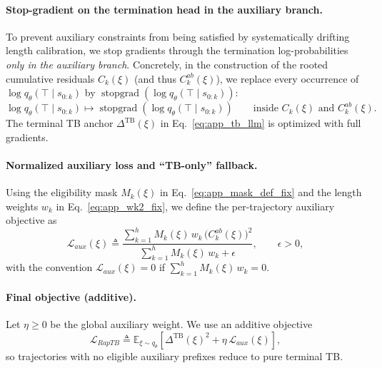 \documentclass{article}
\newcommand{\sg}[1]{\operatorname{stopgrad}\!\left(#1\right)}
\theoremstyle{plain}
\theoremstyle{definition}
\theoremstyle{remark}
\begin{document}
\paragraph{Stop-gradient on the termination head in the auxiliary branch.}
To prevent auxiliary constraints from being satisfied by systematically drifting length calibration,
we stop gradients through the termination log-probabilities \emph{only in the auxiliary branch}.
Concretely, in the construction of the rooted cumulative residuals $C_k(\xi)$ (and thus $C_k^{ab}(\xi)$),
we replace every occurrence of $\log q_\theta(\top\mid s_{0:k})$ by $\sg{\log q_\theta(\top\mid s_{0:k})}$:
\begin{equation}
\label{eq:app_detach_pterm}
\log q_\theta(\top\mid s_{0:k}) \mapsto \sg{\log q_\theta(\top\mid s_{0:k})}
\qquad\text{inside } C_k(\xi)\text{ and }C_k^{ab}(\xi).
\end{equation}
The terminal TB anchor $\Delta^{\mathrm{TB}}(\xi)$ in Eq.~\eqref{eq:app_tb_llm} is optimized with full gradients.

\paragraph{Normalized auxiliary loss and ``TB-only'' fallback.}
Using the eligibility mask $M_k(\xi)$ in Eq.~\eqref{eq:app_mask_def_fix} and the length weights $w_k$ in
Eq.~\eqref{eq:app_wk2_fix}, we define the per-trajectory auxiliary objective as
\begin{equation}
\label{eq:app_aux_fix}
\mathcal{L}_{aux}(\xi)
\triangleq
\frac{\sum_{k=1}^{h} M_k(\xi)\,w_k\,\big(C_k^{ab}(\xi)\big)^2}
{\sum_{k=1}^{h} M_k(\xi)\,w_k + \epsilon},
\qquad \epsilon>0,
\end{equation}
with the convention $\mathcal{L}_{aux}(\xi)=0$ if $\sum_{k=1}^{h} M_k(\xi)\,w_k=0$.

\paragraph{Final objective (additive).}
Let $\eta\ge 0$ be the global auxiliary weight. We use an additive objective
\begin{equation}
\label{eq:app_final_fix}
\mathcal{L}_{RapTB}
\triangleq
\mathbb{E}_{\xi\sim q_\theta}\!\left[
\Delta^{\mathrm{TB}}(\xi)^2
+
\eta\,\mathcal{L}_{aux}(\xi)
\right],
\end{equation}
so trajectories with no eligible auxiliary prefixes reduce to pure terminal TB.
\end{document}
